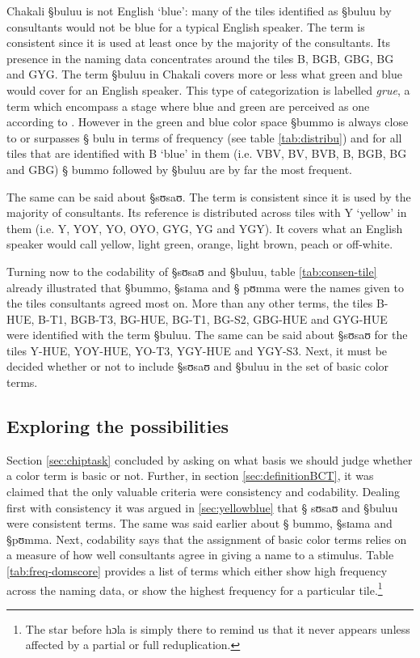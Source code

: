 Chakali {\S buluu} is not English
`blue': many of the  tiles identified as {\S buluu} by  consultants would not
be blue for a typical English speaker.  The
term is 
consistent since it is used at least once by the majority of the consultants.
Its presence in the naming data concentrates around the tiles B, BGB, GBG, BG
and GYG. The term {\S buluu} in Chakali covers more or less what green and blue
would cover
for an English speaker. This type of categorization is labelled
\textit{grue}, a term which encompass a stage where blue and green are perceived
as one according to \citet[262]{Kay75}.  However in
the green and blue color space   {\S bummo} is always close to or surpasses  {\S
bulu} in
terms of frequency (see table \ref{tab:distribu}) and for all tiles that are
identified  with B `blue' in them (i.e. VBV, BV, BVB, B, BGB, BG and  GBG) {\S
bummo}
followed by {\S buluu} are by far the most frequent.  

The same can be said about
{\S sʊsaʊ}. The term is consistent since it is used by the majority
of consultants. Its
reference is distributed across  tiles
with Y  `yellow' in them (i.e. Y,
YOY, YO, OYO, GYG, YG and YGY). It  covers what  an English speaker
would call yellow, light green, orange, light brown, peach or off-white. 

Turning now to the codability of {\S sʊsaʊ} and {\S buluu}, table
\ref{tab:consen-tile} already illustrated that {\S bummo}, {\S sɪama} and  {\S
pʊmma} were the names given to the tiles  consultants agreed  most on. 
More
than any other terms, the tiles B-HUE, B-T1, BGB-T3, BG-HUE, BG-T1, BG-S2,
GBG-HUE and GYG-HUE were identified with the term {\S buluu}. The same can be
said about {\S sʊsaʊ} for the tiles Y-HUE, YOY-HUE, YO-T3, YGY-HUE and YGY-S3.
Next, it must be decided whether or not to include  {\S sʊsaʊ} and {\S buluu} in
the set
of basic color terms.



\subsection{Exploring the possibilities}
\label{sec:prel}

Section \ref{sec:chiptask} concluded  by asking on what basis we
should judge
whether a color term is basic or not.   Further, in section
\ref{sec:definitionBCT},  it was claimed that the only valuable criteria were
consistency and codability. Dealing first with consistency  it was argued in
\ref{sec:yellowblue} that {\S
sʊsaʊ} and {\S buluu} were consistent terms. The same was said earlier about {\S
bummo}, {\S sɪama} and  {\S pʊmma}.  Next,  codability says that the assignment
of basic color
terms  relies on a measure of how well consultants agree in giving a name to a
stimulus. Table \ref{tab:freq-domscore} provides a list of terms which either
show high frequency across the naming data,  or show the highest
frequency for a
particular tile.\footnote{The star before {\F  hɔla} is simply
there to remind us that it never appears unless affected by a partial or full
reduplication.}


